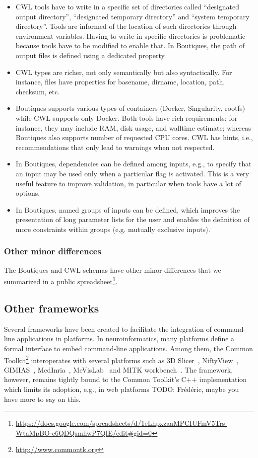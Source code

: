 \documentclass{article}
\newcommand{\todo}[1]{\color{red}TODO: #1\color{black}}
\newcommand{\boutiques}{Boutiques\xspace}
\begin{document}
\begin{itemize}
\item CWL tools have to write in a specific set of directories called
``designated output directory'', ``designated temporary directory''
and ``system temporary directory''. Tools are informed of the location
of such directories through environment variables. Having to write in
specific directories is problematic because tools have to be modified
to enable that. In \boutiques, the path of output files is defined
using a dedicated property.
\item CWL types are richer, not only
semantically but also syntactically. For instance, files have
properties for basename, dirname, location, path, checksum, etc.
\item \boutiques supports various types of containers (Docker, Singularity,
rootfs) while CWL supports only Docker. Both tools have rich requirements:
for instance, they may include RAM, disk usage, and walltime estimate; 
whereas \boutiques also supports number of requested CPU cores. CWL has hints, i.e.,
recommendations that only lead to warnings when not respected.
\item In \boutiques, dependencies can be defined among inputs, e.g., to
specify that an input may be used only when a particular flag is
activated. This is a very useful feature to improve validation, in
particular when tools have a lot of options.
\item In \boutiques, named
groups of inputs can be defined, which improves the presentation of
long parameter lists for the user and enables the definition of more
constraints within groups (e.g. mutually exclusive inputs).
\end{itemize}

\subsubsection{Other minor differences}

The \boutiques and CWL schemas have other minor differences that we
summarized in a public
spreadsheet\footnote{\url{https://docs.google.com/spreadsheets/d/1eLhpxzaaMPCIUFmV5Trs-WtaMpBO-c6QDQsmhwP7QIE/edit\#gid=0}}.

\subsection{Other frameworks}

Several frameworks have been created to facilitate the
integration of command-line applications in platforms. In
neuroinformatics, many platforms define a formal interface to embed
command-line applications. Among them, the Common
Toolkit\footnote{\url{http://www.commontk.org}} interoperates with
several platforms such as 3D Slicer~\cite{pieper20043d},
NiftyView~\cite{Craddock2016}, GIMIAS~\cite{larrabide2009gimias},
MedInria~\cite{larrabide2009gimias}, MeVisLab~\cite{heckel2009object}
and MITK workbench~\cite{nolden2013medical}. The framework, however,
remains tightly bound to the Common Toolkit's C++ implementation which
limits its adoption, e.g., in web platforms \todo{Fr\'ed\'eric, maybe
  you have more to say on this}.
\end{document}
